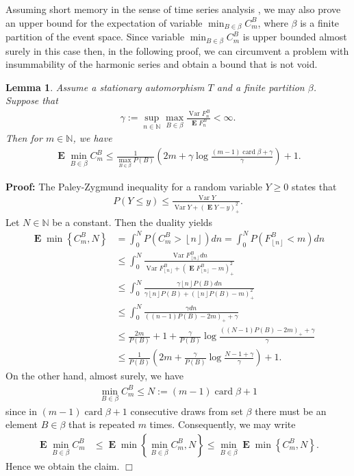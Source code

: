 \documentclass[a4paper,12pt]{article}
\newcommand{\okra}[1]{\left( #1 \right)}
\newcommand{\klam}[1]{\left\{ #1 \right\}}
\newcommand{\floor}[1]{\left\lfloor #1 \right\rfloor}
\DeclareMathOperator{\card}{card}
\DeclareMathOperator{\var}{Var}
\DeclareMathOperator{\mean}{\mathbf{E}}
\newtheorem{lemma}{Lemma}
\newenvironment*{proof}{\begin{trivlist}\item[]
\noindent\textbf{Proof:}}{$\Box$\par\end{trivlist}}
\begin{document}
Assuming short memory in the sense of time series analysis
\citep{Beran94}, we may also prove an upper bound for the expectation
of variable $\min_{B\in\beta} C^B_m$, where $\beta$ is a finite
partition of the event space. Since variable $\min_{B\in\beta} C^B_m$
is upper bounded almost surely in this case then, in the following
proof, we can circumvent a problem with insummability of the harmonic
series and obtain a bound that is not void.
\begin{lemma}
  \label{theoShortMemory}
  Assume a stationary automorphism $T$ and a finite partition $\beta$.
  Suppose that
  \begin{align}
    \gamma:=
    \sup_{n\in\mathbb{N}}\max_{B\in\beta}\frac{\var F^B_n}{\mean F^B_n}<\infty.
  \end{align}
  Then for $m\in\mathbb{N}$, we have
  \begin{align}
    \mean \min_{B\in\beta} C^B_m\le
    \frac{1}{\max_{B\in\beta} P(B)}\okra{
    2m+\gamma\log\frac{(m-1)\card\beta+\gamma}{\gamma}
    }+1
    .
  \end{align}
\end{lemma}
\begin{proof}
  The Paley-Zygmund inequality for a random variable $Y\ge 0$ states
  that
  \begin{align}
    P(Y\le y)\le\frac{\var Y}{\var Y+(\mean Y-y)_+^2}.
  \end{align}
  Let $N\in\mathbb{N}$ be a constant. Then the duality yields
  \begin{align}
    \mean \min\klam{C^B_m,N}
    &=
    \int_0^{N} P(C^B_m>\floor{n}) dn
    =
      \int_0^{N} P(F^B_{\floor{n}}<m) dn
      \nonumber\\
    &\le \int_0^{N} \frac{\var F^B_{\floor{n}}
      dn}{\var F^B_{\floor{n}}+(\mean F^B_{\floor{n}}-m)_+^2}
      \nonumber\\
    & \le \int_0^{N} \frac{\gamma \floor{n}P(B)
      dn}{\gamma \floor{n}P(B)+(\floor{n}P(B)-m)_+^2}
      \nonumber\\
    &\le \int_0^{N}
      \frac{\gamma dn}{((n-1)P(B)-2m)_++\gamma}
      \nonumber\\
    &\le \frac{2m}{P(B)}+1+
      \frac{\gamma}{P(B)}\log\frac{((N-1)P(B)-2m)_++\gamma}{\gamma}
      \nonumber\\
    &\le \frac{1}{P(B)}\okra{2m+
      \frac{\gamma}{P(B)}\log\frac{N-1+\gamma}{\gamma}}+1
      .
  \end{align}
  On the other hand, almost surely, we have
  \begin{align}
    \min_{B\in\beta} C^B_m\le N:=(m-1)\card\beta+1
  \end{align}
  since in $(m-1)\card\beta+1$ consecutive draws from set $\beta$
  there must be an element $B\in\beta$ that is repeated $m$ times.
  Consequently, we may write
  \begin{align}
    \mean \min_{B\in\beta} C^B_m
    &\le \mean \min\klam{\min_{B\in\beta} C^B_m,N}
      \le \min_{B\in\beta} \mean \min\klam{C^B_m, N}
      .
  \end{align}
  Hence we obtain the claim.
\end{proof}
\end{document}
